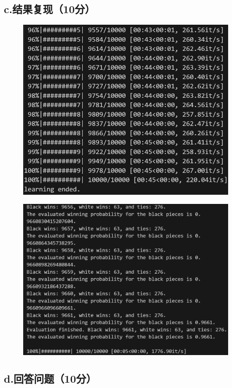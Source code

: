 \documentclass{article}
\begin{document}
\subsection*{c.结果复现（10分）}
\begin{figure}[H]
    \centering
    \includegraphics[width=14cm]{1.png}
\end{figure}
\begin{figure}[H]
    \centering
    \includegraphics[width=14cm]{2.png}
\end{figure}

\subsection*{d.回答问题（10分）}
\end{document}
